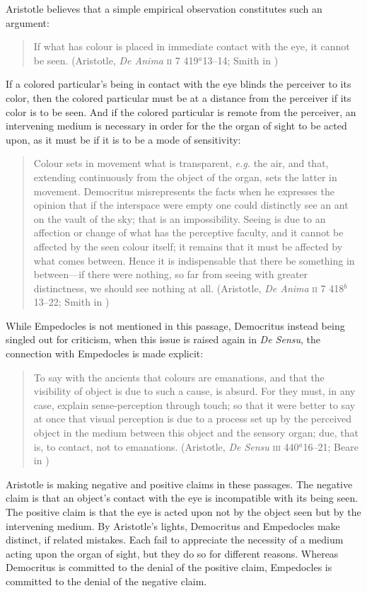 Aristotle believes that a simple empirical observation constitutes such an argument:
\begin{quote}
	If what has colour is placed in immediate contact with the eye, it cannot be seen. (Aristotle, \emph{De Anima} \textsc{ii} 7 419\( ^{a} \)13--14; Smith in \citealt[]{Barnes:1984uq})
\end{quote}
If a colored particular's being in contact with the eye blinds the perceiver to its color, then the colored particular must be at a distance from the perceiver if its color is to be seen. And if the colored particular is remote from the perceiver, an intervening medium is necessary in order for the the organ of sight to be acted upon, as it must be if it is to be a mode of sensitivity:
\begin{quote}
	Colour sets in movement what is transparent, \emph{e.g.} the air, and that, extending continuously from the object of the organ, sets the latter in movement. Democritus misrepresents the facts when he expresses the opinion that if the interspace were empty one could distinctly see an ant on the vault of the sky; that is an impossibility. Seeing is due to an affection or change of what has the perceptive faculty, and it cannot be affected by the seen colour itself; it remains that it must be affected by what comes between. Hence it is indispensable that there be something in between---if there were nothing, so far from seeing with greater distinctness, we should see nothing at all. (Aristotle, \emph{De Anima} \textsc{ii} 7 418\( ^{b} \)13--22; Smith in \citealt[33--34]{Barnes:1984uq})
\end{quote}

While Empedocles is not mentioned in this passage, Democritus instead being singled out for criticism, when this issue is raised again in \emph{De Sensu}, the connection with Empedocles is made explicit:
\begin{quote}
	To say with the ancients that colours are emanations, and that the visibility of object is due to such a cause, is absurd. For they must, in any case, explain sense-perception through touch; so that it were better to say at once that visual perception is due to a process set up by the perceived object in the medium between this object and the sensory organ; due, that is, to contact, not to emanations. (Aristotle, \emph{De Sensu} \textsc{iii} 440\( ^{a} \)16--21; Beare in \citealt[9]{Barnes:1984uq})
\end{quote}

Aristotle is making negative and positive claims in these passages. The negative claim is that an object's contact with the eye is incompatible with its being seen. The positive claim is that the eye is acted upon not by the object seen but by the intervening medium. By Aristotle's lights, Democritus and Empedocles make distinct, if related mistakes. Each fail to appreciate the necessity of a medium acting upon the organ of sight, but they do so for different reasons. Whereas Democritus is committed to the denial of the positive claim, Empedocles is committed to the denial of the negative claim.

